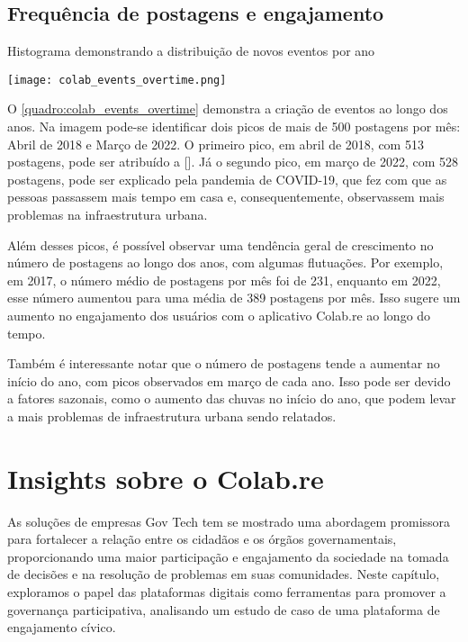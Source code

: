 \subsection*{Frequência de postagens e engajamento}

\begin{quadro}[htb]
	\caption{Histograma demonstrando a distribuição de novos eventos por ano}
	\label{quadro:colab_events_overtime}
	\centering
	\texttt{[image: colab\_events\_overtime.png]}
\end{quadro}

O \autoref{quadro:colab_events_overtime} demonstra a criação de eventos ao longo dos anos. Na imagem pode-se identificar dois picos de mais de 500 postagens por mês: Abril de 2018 e Março de 2022. O primeiro pico, em abril de 2018, com 513 postagens, pode ser atribuído a []. Já o segundo pico, em março de 2022, com 528 postagens, pode ser explicado pela pandemia de COVID-19, que fez com que as pessoas passassem mais tempo em casa e, consequentemente, observassem mais problemas na infraestrutura urbana.

Além desses picos, é possível observar uma tendência geral de crescimento no número de postagens ao longo dos anos, com algumas flutuações. Por exemplo, em 2017, o número médio de postagens por mês foi de 231, enquanto em 2022, esse número aumentou para uma média de 389 postagens por mês. Isso sugere um aumento no engajamento dos usuários com o aplicativo Colab.re ao longo do tempo.

Também é interessante notar que o número de postagens tende a aumentar no início do ano, com picos observados em março de cada ano. Isso pode ser devido a fatores sazonais, como o aumento das chuvas no início do ano, que podem levar a mais problemas de infraestrutura urbana sendo relatados.

\section{Insights sobre o Colab.re}
As soluções de empresas Gov Tech tem se mostrado uma abordagem promissora para fortalecer a relação entre os cidadãos e os órgãos governamentais, proporcionando uma maior participação e engajamento da sociedade na tomada de decisões e na resolução de problemas em suas comunidades. Neste capítulo, exploramos o papel das plataformas digitais como ferramentas para promover a governança participativa, analisando um estudo de caso de uma plataforma de engajamento cívico.

